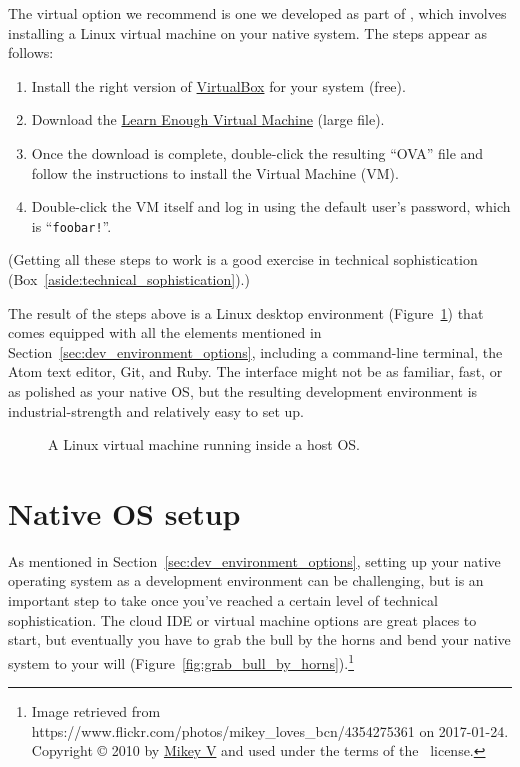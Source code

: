 The virtual option we recommend is one we developed as part of \lecl, which involves installing a Linux virtual machine on your native system. The steps appear as follows:

\begin{enumerate}
\item Install the right version of \href{https://www.virtualbox.org/}{VirtualBox} for your system (free).
\item Download the \href{https://softcover-static.s3.amazonaws.com/LearnEnough-v.1.4.ova}{Learn Enough Virtual Machine} (large file).
\item Once the download is complete, double-click the resulting ``OVA'' file and follow the instructions to install the Virtual Machine (VM).
\item Double-click the VM itself and log in using the default user's password, which is ``\texttt{foobar!}''.
\end{enumerate}
(Getting all these steps to work is a good exercise in technical sophistication (Box~\ref{aside:technical_sophistication}).)

The result of the steps above is a Linux desktop environment (Figure~\ref{fig:virtual_machine}) that comes equipped with all the elements mentioned in Section~\ref{sec:dev_environment_options}, including a command-line terminal, the Atom text editor, Git, and Ruby. The interface might not be as familiar, fast, or as polished as your native OS, but the resulting development environment is industrial-strength and relatively easy to set up.

\begin{figure}
\begin{center}
\end{center}
\caption{A Linux virtual machine running inside a host OS.\label{fig:virtual_machine}}
\end{figure}



\section{Native OS setup} %
\label{sec:native_os_setup}

As mentioned in Section~\ref{sec:dev_environment_options}, setting up your native operating system as a development environment can be challenging, but is an important step to take once you've reached a certain level of technical sophistication. The cloud IDE or virtual machine options are great places to start, but eventually you have to grab the bull by the horns and bend your native system to your will (Figure~\ref{fig:grab_bull_by_horns}).\footnote{Image retrieved from https://www.flickr.com/photos/mikey\_loves\_bcn/4354275361 on 2017-01-24. Copyright © 2010 by \href{https://www.flickr.com/photos/mikey_loves_bcn/}{Mikey V} and used under the terms of the \ccbync\ license.}

